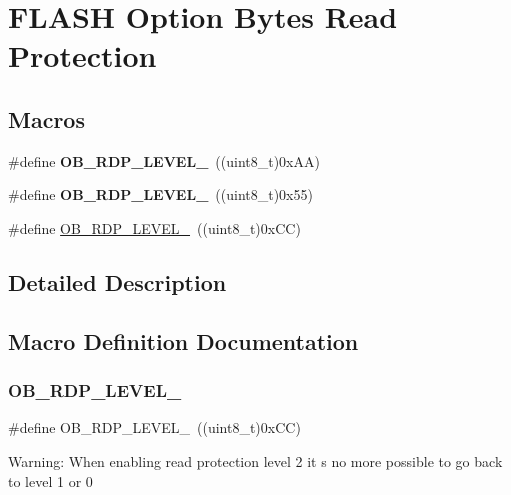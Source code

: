 \hypertarget{group___f_l_a_s_h_ex___option___bytes___read___protection}{}\section{F\+L\+A\+SH Option Bytes Read Protection}
\label{group___f_l_a_s_h_ex___option___bytes___read___protection}
\subsection*{Macros}
\begin{DoxyCompactItemize}
\item 
\mbox{\label{group___f_l_a_s_h_ex___option___bytes___read___protection_ga22c7871bda267a2844ab9ca9f7bd38e4}} 
\#define {\bfseries O\+B\+\_\+\+R\+D\+P\+\_\+\+L\+E\+V\+E\+L\+\_}~((uint8\+\_\+t)0x\+A\+A)
\item 
\mbox{\label{group___f_l_a_s_h_ex___option___bytes___read___protection_ga778207f0d12d87bbff9d55e985aba5bc}} 
\#define {\bfseries O\+B\+\_\+\+R\+D\+P\+\_\+\+L\+E\+V\+E\+L\+\_}~((uint8\+\_\+t)0x55)
\item 
\#define \hyperlink{group___f_l_a_s_h_ex___option___bytes___read___protection_ga2262afca565429ce2808d835c49e5ee6}{O\+B\+\_\+\+R\+D\+P\+\_\+\+L\+E\+V\+E\+L\+\_}~((uint8\+\_\+t)0x\+C\+C)
\end{DoxyCompactItemize}


\subsection{Detailed Description}


\subsection{Macro Definition Documentation}
\mbox{\label{group___f_l_a_s_h_ex___option___bytes___read___protection_ga2262afca565429ce2808d835c49e5ee6}} 
\subsubsection{\texorpdfstring{O\+B\+\_\+\+R\+D\+P\+\_\+\+L\+E\+V\+E\+L\+\_}{OB\_RDP\_LEVEL\_2}}
{\footnotesize\ttfamily \#define O\+B\+\_\+\+R\+D\+P\+\_\+\+L\+E\+V\+E\+L\+\_~((uint8\+\_\+t)0x\+C\+C)}

Warning\+: When enabling read protection level 2 it s no more possible to go back to level 1 or 0 